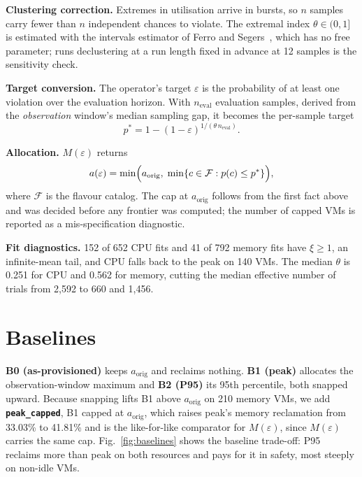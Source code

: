 \documentclass[conference]{IEEEtran}
\newcommand{\Meps}{$M(\varepsilon)$}
\begin{document}
\textbf{Clustering correction.} Extremes in utilisation arrive in bursts, so $n$ samples carry fewer than $n$ independent chances to violate. The extremal index $\theta \in (0,1]$ is estimated with the intervals estimator of Ferro and Segers~\cite{ferro2003}, which has no free parameter; runs declustering at a run length fixed in advance at 12 samples is the sensitivity check.

\textbf{Target conversion.} The operator's target $\varepsilon$ is the probability of at least one violation over the evaluation horizon. With $n_{\mathrm{eval}}$ evaluation samples, derived from the \emph{observation} window's median sampling gap, it becomes the per-sample target
\begin{equation}
p^{*} = 1 - (1-\varepsilon)^{1/(\theta\, n_{\mathrm{eval}})}. \label{eq:target}
\end{equation}

\textbf{Allocation.} \Meps{} returns
\begin{equation}
a(\varepsilon) = \min\Bigl(a_{\mathrm{orig}},\; \min\{c \in \mathcal{F} : p(c) \le p^{*}\}\Bigr), \label{eq:alloc}
\end{equation}
where $\mathcal{F}$ is the flavour catalog. The cap at $a_{\mathrm{orig}}$ follows from the first fact above and was decided before any frontier was computed; the number of capped VMs is reported as a mis-specification diagnostic.

\textbf{Fit diagnostics.} 152 of 652 CPU fits and 41 of 792 memory fits have $\xi \ge 1$, an infinite-mean tail, and CPU falls back to the peak on 140 VMs. The median $\theta$ is 0.251 for CPU and 0.562 for memory, cutting the median effective number of trials from 2,592 to 660 and 1,456.

\section{Baselines}
\textbf{B0 (as-provisioned)} keeps $a_{\mathrm{orig}}$ and reclaims nothing. \textbf{B1 (peak)} allocates the observation-window maximum and \textbf{B2 (P95)} its 95th percentile, both snapped upward. Because snapping lifts B1 above $a_{\mathrm{orig}}$ on 210 memory VMs, we add \textbf{\texttt{peak\_capped}}, B1 capped at $a_{\mathrm{orig}}$, which raises peak's memory reclamation from 33.03\% to 41.81\% and is the like-for-like comparator for \Meps, since \Meps{} carries the same cap. Fig.~\ref{fig:baselines} shows the baseline trade-off: P95 reclaims more than peak on both resources and pays for it in safety, most steeply on non-idle VMs.
\end{document}
